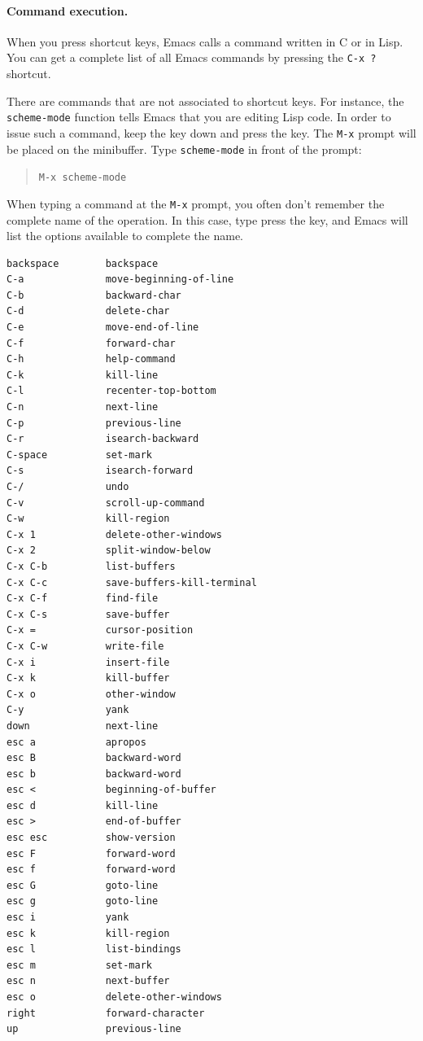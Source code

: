 \documentclass[a4paper,12pt]{book}
\begin{document}
\paragraph{Command execution.} When you press 
shortcut keys, Emacs calls a command written in
C or in Lisp. You can get a complete list of all
Emacs commands by pressing the \verb|C-x ?| shortcut.

There are commands that are not associated to
shortcut keys. For instance, the \verb|scheme-mode|
function tells Emacs that you are editing Lisp code. 
In order to issue such a command, keep the 
key down and press the  key. The \verb|M-x|
prompt will be placed on the minibuffer. Type 
\verb|scheme-mode| in front of the prompt:
\begin{quote}
	\verb|M-x scheme-mode|
\end{quote}
When typing a command at the \verb|M-x| prompt, you
often don't remember the complete name of the operation.
In this case, type press the  key, and Emacs will
list the options available to complete the name.

\begin{verbatim}
backspace        backspace
C-a              move-beginning-of-line
C-b              backward-char
C-d              delete-char
C-e              move-end-of-line
C-f              forward-char
C-h              help-command
C-k              kill-line
C-l              recenter-top-bottom
C-n              next-line
C-p              previous-line
C-r              isearch-backward
C-space          set-mark
C-s              isearch-forward
C-/              undo
C-v              scroll-up-command
C-w              kill-region
C-x 1            delete-other-windows
C-x 2            split-window-below
C-x C-b          list-buffers
C-x C-c          save-buffers-kill-terminal
C-x C-f          find-file
C-x C-s          save-buffer
C-x =            cursor-position
C-x C-w          write-file
C-x i            insert-file
C-x k            kill-buffer
C-x o            other-window
C-y              yank
down             next-line
esc a            apropos
esc B            backward-word
esc b            backward-word
esc <            beginning-of-buffer
esc d            kill-line
esc >            end-of-buffer
esc esc          show-version
esc F            forward-word
esc f            forward-word
esc G            goto-line
esc g            goto-line
esc i            yank
esc k            kill-region
esc l            list-bindings
esc m            set-mark
esc n            next-buffer
esc o            delete-other-windows
right            forward-character
up               previous-line
\end{verbatim}
\end{document}
